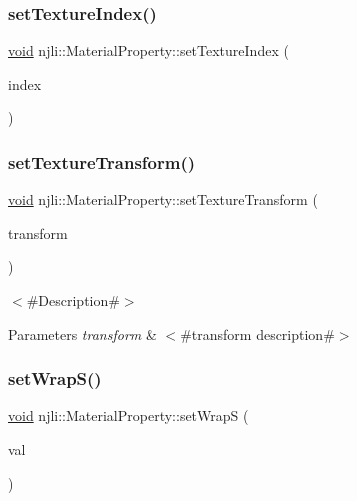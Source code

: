 \subsubsection{\texorpdfstring{set\+Texture\+Index()}{setTextureIndex()}}
{\footnotesize\ttfamily \mbox{\hyperlink{_thread_8h_af1e856da2e658414cb2456cb6f7ebc66}{void}} njli\+::\+Material\+Property\+::set\+Texture\+Index (\begin{DoxyParamCaption}\item[{\mbox{\hyperlink{_util_8h_aed742c436da53c1080638ce6ef7d13de}{u8}}}]{index }\end{DoxyParamCaption})\hspace{0.3cm}{\ttfamily [protected]}}

\mbox{\label{classnjli_1_1_material_property_a8c9ed69e9d9965c8aaaa8e5a79ce1d3f}} 
\subsubsection{\texorpdfstring{set\+Texture\+Transform()}{setTextureTransform()}}
{\footnotesize\ttfamily \mbox{\hyperlink{_thread_8h_af1e856da2e658414cb2456cb6f7ebc66}{void}} njli\+::\+Material\+Property\+::set\+Texture\+Transform (\begin{DoxyParamCaption}\item[{const bt\+Transform \&}]{transform }\end{DoxyParamCaption})}

$<$\#\+Description\#$>$


\begin{DoxyParams}{Parameters}
{\em transform} & $<$\#transform description\#$>$ \\
\hline
\end{DoxyParams}
\mbox{\label{classnjli_1_1_material_property_a373bb320a2411e19eb79b376bdace858}} 
\subsubsection{\texorpdfstring{set\+Wrap\+S()}{setWrapS()}}
{\footnotesize\ttfamily \mbox{\hyperlink{_thread_8h_af1e856da2e658414cb2456cb6f7ebc66}{void}} njli\+::\+Material\+Property\+::set\+WrapS (\begin{DoxyParamCaption}\item[{\mbox{\hyperlink{namespacenjli_a6e9496d4850ec7151f04a220e1979b62}{njli\+Texture\+Wrap\+Type}}}]{val }\end{DoxyParamCaption})}

